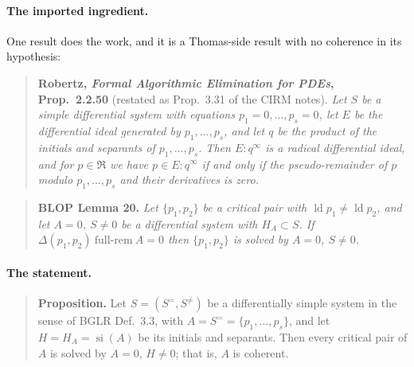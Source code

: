 \documentclass[11pt]{article}
\newcommand{\ld}{\operatorname{ld}}
\newcommand{\si}{\operatorname{si}}
\newcommand{\R}{\mathfrak{R}}
\begin{document}
\paragraph{The imported ingredient.} One result does the work, and it is a
Thomas-side result with no coherence in its hypothesis:

\begin{quote}
\textbf{Robertz, \emph{Formal Algorithmic Elimination for PDEs}, Prop.~2.2.50}
(restated as Prop.~3.31 of the CIRM notes). \emph{Let $S$ be a simple
differential system with equations $p_1=0,\dots,p_s=0$, let $E$ be the
differential ideal generated by $p_1,\dots,p_s$, and let $q$ be the product of
the initials and separants of $p_1,\dots,p_s$. Then $E:q^\infty$ is a radical
differential ideal, and for $p\in\R$ we have $p\in E:q^\infty$ if and only if
the pseudo-remainder of $p$ modulo $p_1,\dots,p_s$ and their derivatives is
zero.}
\end{quote}

\begin{quote}
\textbf{BLOP Lemma 20.} \emph{Let $\{p_1,p_2\}$ be a critical pair with
$\ld p_1\ne\ld p_2$, and let $A=0$, $S\ne0$ be a differential system with
$H_A\subset S$. If $\Delta(p_1,p_2)\ \mathrm{full\text{-}rem}\ A=0$ then
$\{p_1,p_2\}$ is solved by $A=0$, $S\ne0$.}
\end{quote}

\paragraph{The statement.}

\begin{quote}
\textbf{Proposition.} Let $S=(S^=,S^{\ne})$ be a differentially simple system in
the sense of BGLR Def.~3.3, with $A=S^==\{p_1,\dots,p_s\}$, and let
$H=H_A=\si(A)$ be its initials and separants. Then every critical pair of $A$ is
solved by $A=0$, $H\ne0$; that is, $A$ is coherent.
\end{quote}
\end{document}
